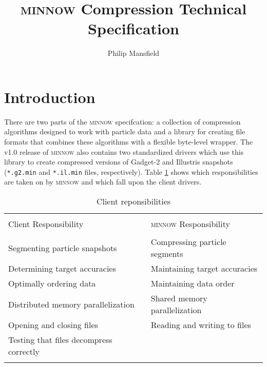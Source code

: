 \documentclass[numberedappendix,apj]{emulateapj}
\begin{document}

\title{\textsc{minnow} Compression Technical Specification}

\author{Philip Mansfield}


\section{Introduction}

There are two parts of the \textsc{minnow} specifcation: a collection of
compression algorithms designed to work with particle data and a library for
creating file formats that combines these algorithms with a flexible byte-level
wrapper. The v1.0 release of \textsc{minnow} also contains two standardized
drivers which use this library to create compressed versions of Gadget-2 and
Illustris snapshots (\texttt{*.g2.min} and \texttt{*.il.min} files,
respectively). Table \ref{tab:separation_of_duties} shows which responsibilities
are taken on by \textsc{minnow} and which fall upon the client drivers.

\begin{table}
   \centering
   \caption{Client reponsibilities}
   \label{tab:separation_of_duties}
   \begin{tabular}{ll}
   \hline
   \hline       
   \\
   Client Responsibility & \textsc{minnow} Responsibility
   \\
   \hline
   \\
   Segmenting particle snapshots & Compressing particle segments \\
   Determining target accuracies & Maintaining target accuracies \\
   Optimally ordering data & Maintaining data order \\
   Distributed memory parallelization & Shared memory parallelization \\
   Opening and closing files & Reading and writing to files \\
   Testing that files decompress correctly & 
   \\
   \hline
   \\
   \end{tabular}
\end{table}
\end{document}
